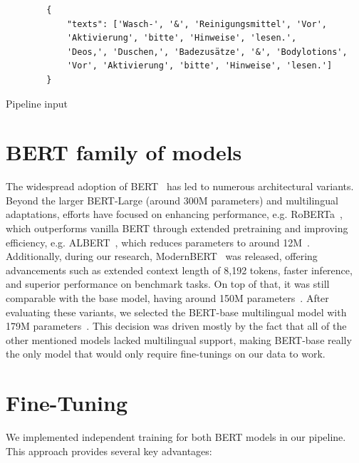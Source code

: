 \documentclass[licencjacka,en]{pracamgr}
\begin{document}
\begin{center}
   \begin{listing}
        \begin{verbatim}
        {
            "texts": ['Wasch-', '&', 'Reinigungsmittel', 'Vor',
            'Aktivierung', 'bitte', 'Hinweise', 'lesen.',
            'Deos,', 'Duschen,', 'Badezusätze', '&', 'Bodylotions',
            'Vor', 'Aktivierung', 'bitte', 'Hinweise', 'lesen.']
        }
        \end{verbatim}
        \caption{Pipeline input}
        \label{list:sel-input}
    \end{listing}
\end{center}

\section{BERT family of models}
The widespread adoption of BERT~\cite{BERT_hf} has led to numerous architectural variants. Beyond the larger BERT-Large (around 300M parameters) and multilingual adaptations, efforts have focused on enhancing performance, e.g. RoBERTa~\cite{RoBERTa}, which outperforms vanilla BERT through extended pretraining and improving efficiency, e.g. ALBERT~\cite{ALBERT}, which reduces parameters to  around 12M~\cite{ALBERT_hf}.
Additionally, during our research, ModernBERT~\cite{ModernBERTPaper} was released, offering advancements such as extended context length of 8,192 tokens, faster inference, and superior performance on benchmark tasks. On top of that, it was still comparable with the base model, having around 150M parameters~\cite{ModernBERThf}.
After evaluating these variants, we selected the BERT-base multilingual model with 179M parameters~\cite{BERT_multiling}. This decision was driven mostly by the fact that all of the other mentioned models lacked multilingual support, making BERT-base really the only model that would only require fine-tunings on our data to work.

\section{Fine-Tuning}
We implemented independent training for both BERT models in our pipeline. This approach provides several key advantages:
\end{document}
